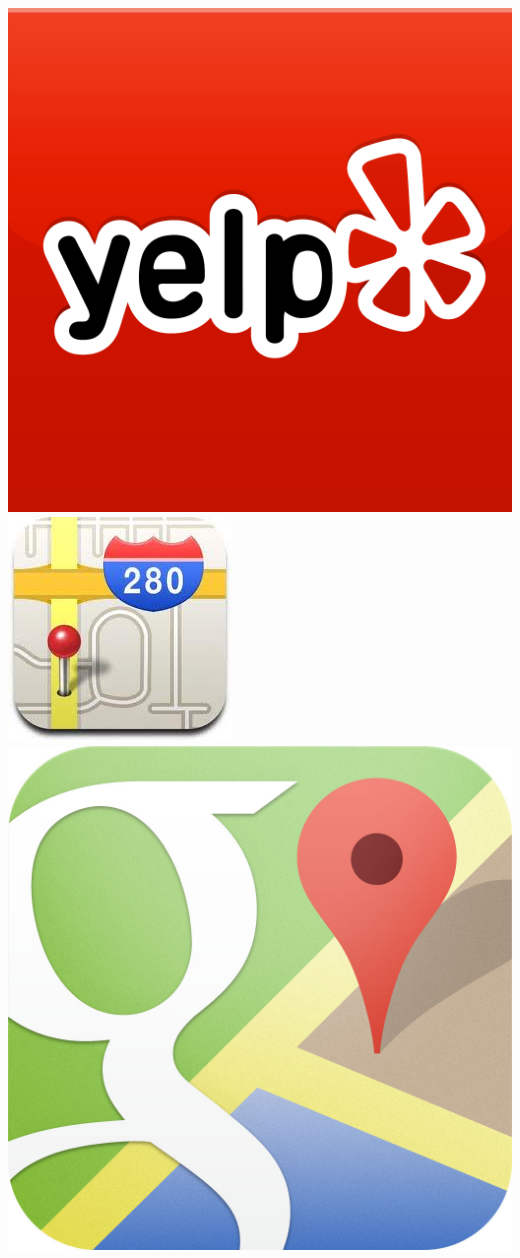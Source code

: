\documentclass[a2,landscape]{a0poster}
\begin{document}
\begin{itemize}
\begin{center}
	\includegraphics[scale=0.078]{plots/logo_yelp}   
	\includegraphics[scale=0.36]{plots/logo_apple_maps}
   \includegraphics[scale=0.34]{plots/logo_google_maps}

\end{center}
\end{itemize}
\end{document}
